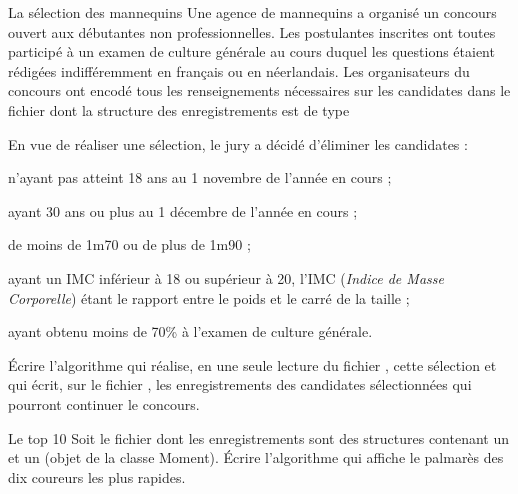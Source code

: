 \begin{Exercice}{La sélection des mannequins}
	Une agence de mannequins a organisé un concours ouvert aux débutantes
	non professionnelles. Les postulantes inscrites ont toutes participé à
	un examen de culture générale au cours duquel les questions étaient
	rédigées indifféremment en français ou en néerlandais. Les
	organisateurs du concours ont encodé tous les renseignements
	nécessaires sur les candidates dans le fichier  dont la structure
	des enregistrements est de type  
	
	
	En vue de réaliser une sélection, le jury a décidé d’éliminer les
	candidates :

	\begin{liste}
		\item 
			n’ayant pas atteint 18 ans au 1 novembre de l’année
			en cours ;
		\item 
			ayant 30 ans ou plus au 1 décembre de l’année en
			cours ;
		\item 
			de moins de 1m70 ou de plus de 1m90 ;
		\item 
			ayant un IMC inférieur à 18 ou supérieur à 20, l’IMC (\textit{Indice de
			Masse Corporelle}) étant le rapport entre le poids et le carré de la
			taille ;
		\item 
			ayant obtenu moins de 70\% à l’examen de culture générale.
	\end{liste}
	
	Écrire l’algorithme qui réalise, en une seule lecture du fichier ,
	cette sélection et qui écrit, sur le fichier , les
	enregistrements des candidates sélectionnées qui pourront continuer le
	concours.
\end{Exercice}

\begin{Exercice}{Le top 10}
	Soit le fichier  dont les enregistrements
	sont des structures contenant un  et un  
	(objet de la classe Moment). 
	Écrire l’algorithme qui affiche le palmarès des dix 
	coureurs les plus rapides.
\end{Exercice}

